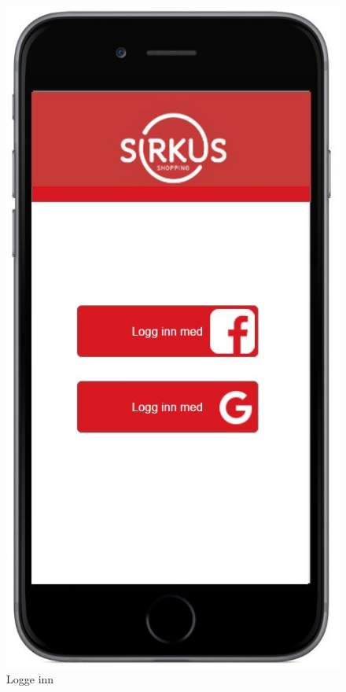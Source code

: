\begin{figure}[H]
\includegraphics[scale=0.55]{images/axurebilder/login}
\centering %
\caption{Logge inn}
\label{fig:login}
\end{figure}

